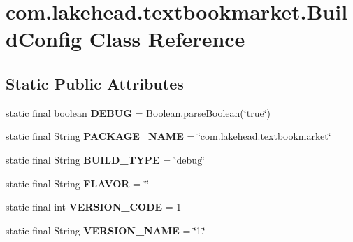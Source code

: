 \hypertarget{classcom_1_1lakehead_1_1textbookmarket_1_1_build_config}{\section{com.\-lakehead.\-textbookmarket.\-Build\-Config Class Reference}
\label{classcom_1_1lakehead_1_1textbookmarket_1_1_build_config}
}
\subsection*{Static Public Attributes}
\begin{DoxyCompactItemize}
\item 
\hypertarget{classcom_1_1lakehead_1_1textbookmarket_1_1_build_config_acc184077a43be6ffd2b6a92ee31bb320}{static final boolean {\bfseries D\-E\-B\-U\-G} = Boolean.\-parse\-Boolean(\char`\"{}true\char`\"{})}\label{classcom_1_1lakehead_1_1textbookmarket_1_1_build_config_acc184077a43be6ffd2b6a92ee31bb320}

\item 
\hypertarget{classcom_1_1lakehead_1_1textbookmarket_1_1_build_config_acd92f12188e61e05a36b3cdcedc4bb4b}{static final String {\bfseries P\-A\-C\-K\-A\-G\-E\-\_\-\-N\-A\-M\-E} = \char`\"{}com.\-lakehead.\-textbookmarket\char`\"{}}\label{classcom_1_1lakehead_1_1textbookmarket_1_1_build_config_acd92f12188e61e05a36b3cdcedc4bb4b}

\item 
\hypertarget{classcom_1_1lakehead_1_1textbookmarket_1_1_build_config_a49897f06b16bced085ab31cd97fda2fc}{static final String {\bfseries B\-U\-I\-L\-D\-\_\-\-T\-Y\-P\-E} = \char`\"{}debug\char`\"{}}\label{classcom_1_1lakehead_1_1textbookmarket_1_1_build_config_a49897f06b16bced085ab31cd97fda2fc}

\item 
\hypertarget{classcom_1_1lakehead_1_1textbookmarket_1_1_build_config_a63e6e3bd60dd4b8a9e8b130edde579f2}{static final String {\bfseries F\-L\-A\-V\-O\-R} = \char`\"{}\char`\"{}}\label{classcom_1_1lakehead_1_1textbookmarket_1_1_build_config_a63e6e3bd60dd4b8a9e8b130edde579f2}

\item 
\hypertarget{classcom_1_1lakehead_1_1textbookmarket_1_1_build_config_a8a4b4c6f4f23ba0df74672d68db5a277}{static final int {\bfseries V\-E\-R\-S\-I\-O\-N\-\_\-\-C\-O\-D\-E} = 1}\label{classcom_1_1lakehead_1_1textbookmarket_1_1_build_config_a8a4b4c6f4f23ba0df74672d68db5a277}

\item 
\hypertarget{classcom_1_1lakehead_1_1textbookmarket_1_1_build_config_aabd5b5188ef9131933e2992f90b89260}{static final String {\bfseries V\-E\-R\-S\-I\-O\-N\-\_\-\-N\-A\-M\-E} = \char`\"{}1.\char`\"{}}\label{classcom_1_1lakehead_1_1textbookmarket_1_1_build_config_aabd5b5188ef9131933e2992f90b89260}

\end{DoxyCompactItemize}


